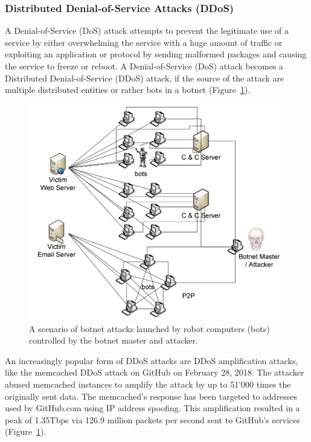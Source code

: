 \subsubsection{Distributed Denial-of-Service Attacks (DDoS)}
A Denial-of-Service (DoS) attack attempts to prevent the legitimate use of a service by either overwhelming the service with a huge amount of traffic or exploiting an application or protocol by sending malformed packages and causing the service to freeze or reboot.
A Denial-of-Service (DoS) attack becomes a Distributed Denial-of-Service (DDoS) attack, if the source of the attack are multiple distributed entities or rather bots in a botnet (Figure~\ref{fig:ddos}).\cite{Mirkovic04}

\begin{figure}[ht]
\begin{center} \includegraphics[scale=0.4]{Talk11/DDoS-attack} \end{center}
\caption{A scenario of botnet attacks launched by robot computers (bots) controlled by the botnet master and attacker.\cite{Li09}}
\label{fig:ddos}
\end{figure}

An increasingly popular form of DDoS attacks are DDoS amplification attacks, like the memcached DDoS attack on GitHub on February 28, 2018.
The attacker abused memcached instances to amplify the attack by up to 51'000 times the originally sent data.
The memcached's response has been targeted to addresses used by GitHub.com using IP address spoofing.
This amplification resulted in a peak of 1.35Tbps via 126.9 million packets per second sent to GitHub's services (Figure~\ref{fig:ddos}).\cite{Kottler18}

